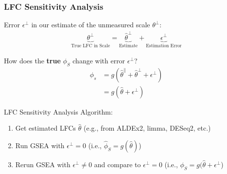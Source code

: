 \documentclass[11pt,t]{beamer}
\begin{document}
\begin{frame}
  \frametitle{LFC Sensitivity Analysis}

  Error \(\epsilon^\perp\) in our estimate of the unmeasured scale \(\theta^\perp\):
  \begin{align*}
    \underbrace{\theta^\perp}_{\text{True LFC in Scale}} = \underbrace{\hat{\theta}^\perp}_{\text{Estimate}} + \underbrace{\epsilon^\perp}_{\text{Estimation Error}}
  \end{align*}

  \pause
  
    How does the \textbf{true} \(\phi_S\) change with error \(\epsilon^\perp\)?
    \begin{align*}
      \phi_s &= g(\hat{\theta}^\parallel+ \hat{\theta}^\perp + \epsilon^\perp) \\
           &= g(\hat{\theta}+\epsilon^\perp)
    \end{align*}
  
  \pause

  LFC Sensitivity Analysis Algorithm:
  \begin{enumerate}
    \item Get estimated LFCs \(\hat{\theta}\) (e.g., from ALDEx2, limma, DESeq2, etc.)
    \pause
    \item Run GSEA with \(\epsilon^\perp=0\) (i.e., \(\hat{\phi}_S=g(\hat{\theta})\))
    \pause
    \item Rerun GSEA with \(\epsilon^\perp \neq 0\) and compare to \(\epsilon^\perp=0\) (i.e., \(\phi_S=g(\hat{\theta}+\epsilon^\perp\))
  \end{enumerate}

\end{frame}
\end{document}
